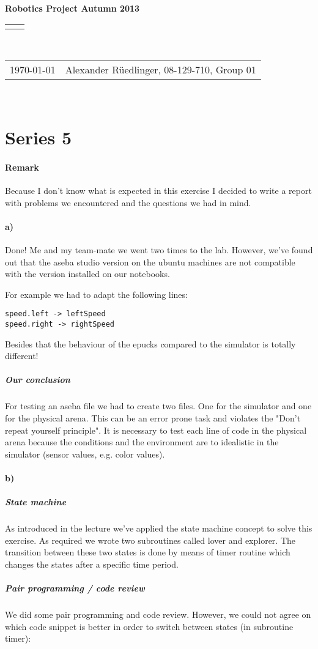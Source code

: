 \documentclass[12pt]{article}
\renewcommand{\title}[1]{\textbf{#1}\\}
\renewcommand{\line}{\begin{tabularx}{\textwidth}{X>{\raggedleft}X}\hline\\\end{tabularx}\\[-0.5cm]}
\newcommand{\leftright}[2]{\begin{tabularx}{\textwidth}{X>{\raggedleft}X}#1%
& #2\\\end{tabularx}\\[-0.5cm]}
\begin{document}
\title{Robotics Project  Autumn 2013}
\line
\leftright{\today}{Alexander Rüedlinger, 08-129-710, Group 01} %
\section*{Series 5}
\paragraph{Remark} 
Because I don't know what is expected in this exercise I decided to write a report with problems we encountered and the questions we had in mind.

\paragraph{a)} Done! Me and my team-mate we went two times to the lab.
However, we've found out that the aseba studio version on the ubuntu machines are not compatible with the version installed on our notebooks.

For example we had to adapt the following lines:
\begin{lstlisting}
speed.left -> leftSpeed
speed.right -> rightSpeed
\end{lstlisting}

Besides that the behaviour of the epucks compared to the simulator is totally different!
\subparagraph{Our conclusion}
For testing an aseba file we had to create two files. One for the simulator and one for the physical arena. This can be an error prone task and violates the "Don't repeat yourself principle". It is necessary to test each line of code in the physical arena because the conditions and the environment are to idealistic in the simulator (sensor values, e.g. color values).

\paragraph{b)}
\subparagraph{State machine}
As introduced in the lecture we've applied the state machine concept to solve this exercise.
As required we wrote two subroutines called lover and explorer. The transition between these two states is done by means of timer routine which changes the states after a specific time period.
\subparagraph{Pair programming / code review}
We did some pair programming and code review. However, we could not agree on which code snippet is better in order to switch between states (in subroutine timer):
\end{document}
